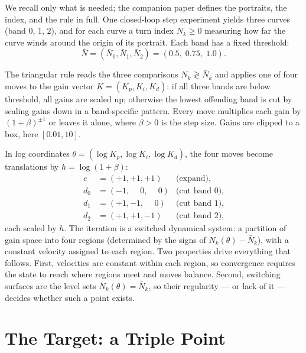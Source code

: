 \documentclass[twocolumn]{ifacconf}
\newcommand{\Nbar}{\bar{N}}
\begin{document}
We recall only what is needed; the companion paper \cite{Paper1} defines the
portraits, the index, and the rule in full. One closed-loop step experiment
yields three curves (band $0$, $1$, $2$), and for each curve a turn index
$N_k \ge 0$ measuring how far the curve winds around the origin of its
portrait. Each band has a fixed threshold:
\begin{equation}
\Nbar = (\Nbar_0, \Nbar_1, \Nbar_2) = (0.5,\; 0.75,\; 1.0).
\label{eq:thresholds}
\end{equation}

The triangular rule reads the three comparisons $N_k \gtrless \Nbar_k$ and
applies one of four moves to the gain vector $K = (K_p, K_i, K_d)$: if all
three bands are below threshold, all gains are scaled up; otherwise the lowest
offending band is cut by scaling gains down in a band-specific pattern. Every
move multiplies each gain by $(1+\beta)^{\pm 1}$ or leaves it alone, where
$\beta > 0$ is the step size. Gains are clipped to a box, here $[0.01, 10]$.

In log coordinates $\theta = (\log K_p, \log K_i, \log K_d)$, the four moves
become translations by $h = \log(1+\beta)$:
\begin{equation}
\begin{aligned}
e   &= (+1, +1, +1) &\text{(expand),}\\
d_0 &= (-1, \phantom{+}0, \phantom{+}0) &\text{(cut band 0),}\\
d_1 &= (+1, -1, \phantom{+}0) &\text{(cut band 1),}\\
d_2 &= (+1, +1, -1) &\text{(cut band 2),}
\end{aligned}
\label{eq:moves}
\end{equation}
each scaled by $h$. The iteration is a switched dynamical system: a partition
of gain space into four regions (determined by the signs of $N_k(\theta) -
\Nbar_k$), with a constant velocity assigned to each region. Two properties
drive everything that follows. First, velocities are constant within each
region, so convergence requires the state to reach where regions meet and moves
balance. Second, switching surfaces are the level sets $N_k(\theta) = \Nbar_k$,
so their regularity --- or lack of it --- decides whether such a point exists.

\section{The Target: a Triple Point}
\label{sec:triple}
\end{document}

